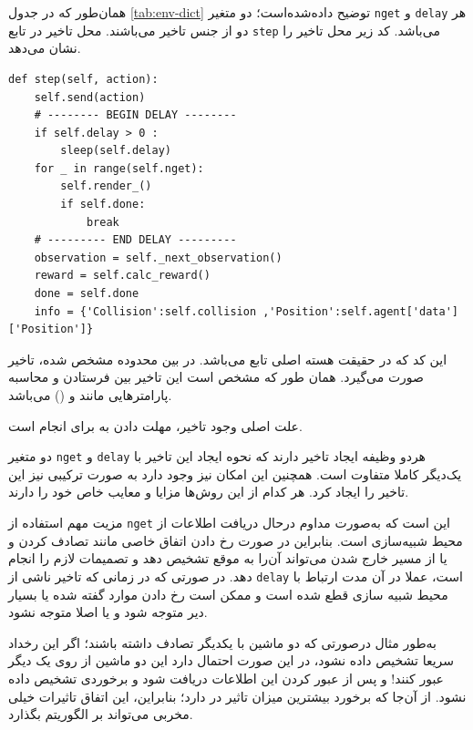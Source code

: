 همان‌طور که در جدول \ref{tab:env-dict} توضیح داده‌شده‌است؛ دو متغیر \texttt{nget} و  \texttt{delay} هر دو از جنس تاخیر می‌باشند. محل تاخیر در تابع \texttt{step} می‌باشد. کد زیر محل تاخیر را نشان می‌دهد.

\begin{latin}
\begin{lstlisting}
def step(self, action):	
	self.send(action)
	# -------- BEGIN DELAY --------
	if self.delay > 0 :
		sleep(self.delay)
	for _ in range(self.nget):
		self.render_()
		if self.done:
			break
	# --------- END DELAY -‌--------
	observation = self._next_observation()
	reward = self.calc_reward()
	done = self.done
	info = {'Collision':self.collision ,'Position':self.agent['data']['Position']}
\end{lstlisting}
\end{latin}

این کد که در حقیقت هسته اصلی
 تابع  می‌باشد. در بین محدوده مشخص شده، تاخیر صورت می‌گیرد. همان طور که مشخص است این تاخیر بین فرستادن  و محاسبه پارامتر‌هایی مانند  و ()
می‌باشد. 
\begin{note}
	علت اصلی وجود تاخیر، مهلت دادن به  برای انجام  است.
\end{note}

دو متغیر \texttt{nget} و \texttt{delay} هردو وظیفه ایجاد تاخیر دارند که نحوه ایجاد این تاخیر با یک‌دیگر کاملا متفاوت است. همچنین این امکان نیز وجود دارد به صورت ترکیبی نیز این تاخیر را ایجاد کرد. هر کدام از این روش‌ها مزایا و معایب خاص خود را دارند.

مزیت مهم استفاده از \texttt{nget} این است که به‌صورت مداوم در‌حال دریافت اطلاعات از محیط شبیه‌سازی است. بنابراین در صورت رخ دادن اتفاق خاصی مانند تصادف کردن و یا از مسیر خارج شدن می‌تواند آن‌را به موقع تشخیص دهد و تصمیمات لازم را انجام دهد.
در صورتی که در زمانی که تاخیر ناشی از \texttt{delay} است، عملا در آن مدت ارتباط با محیط شبیه سازی قطع شده است و ممکن است رخ دادن موارد گفته شده یا بسیار دیر متوجه شود و یا اصلا متوجه نشود. 

به‌طور مثال درصورتی که دو ماشین با یکدیگر تصادف داشته باشند؛ اگر این رخداد سریعا تشخیص داده نشود، در این صورت احتمال دارد این دو ماشین از روی یک دیگر عبور کنند! و پس از عبور کردن این اطلاعات دریافت شود و برخوردی تشخیص داده نشود. از آن‌جا که برخورد بیشترین میزان تاثیر در  دارد؛ بنابراین، این اتفاق تاثیرات خیلی مخربی می‌تواند بر الگوریتم بگذارد.

